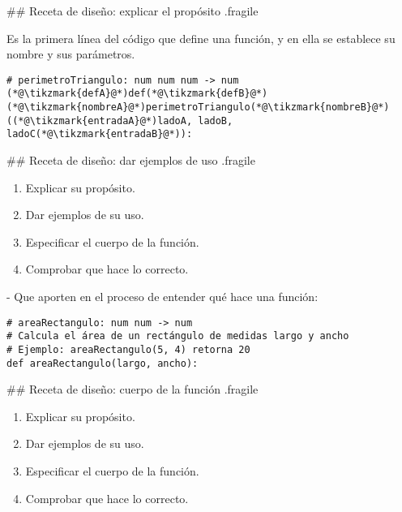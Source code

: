 ## Receta de diseño: explicar el propósito {.fragile}


\bgnblockdefinition
{} Es la primera línea del código que define una función, y
en ella se establece su nombre y sus parámetros.
\trmblockdefinition

\pause

\begin{lstlisting}[basicstyle=\normalsize\ttfamily,linewidth=.9\textwidth,xleftmargin=.1\textwidth]
# perimetroTriangulo: num num num -> num
(*@\tikzmark{defA}@*)def(*@\tikzmark{defB}@*) (*@\tikzmark{nombreA}@*)perimetroTriangulo(*@\tikzmark{nombreB}@*)((*@\tikzmark{entradaA}@*)ladoA, ladoB, ladoC(*@\tikzmark{entradaB}@*)):
\end{lstlisting}


## Receta de diseño: dar ejemplos de uso {.fragile}

    \begin{enumerate}
        \item Explicar su propósito.
        \item \alert{Dar ejemplos de su uso.}
        \item Especificar el cuerpo de la función.
        \item Comprobar que hace lo correcto.
    \end{enumerate}
\trmblockgood

- Que aporten en el proceso de entender qué hace una función:

\begin{lstlisting}[style=frame02,linebackgroundcolor={\btLstHL{3}}]
# areaRectangulo: num num -> num
# Calcula el área de un rectángulo de medidas largo y ancho
# Ejemplo: areaRectangulo(5, 4) retorna 20
def areaRectangulo(largo, ancho):
\end{lstlisting}

## Receta de diseño: cuerpo de la función {.fragile}

    \begin{enumerate}
        \item Explicar su propósito.
        \item Dar ejemplos de su uso.
        \item \alert{Especificar el cuerpo de la función.}
        \item Comprobar que hace lo correcto.
    \end{enumerate}
\trmblockgood

